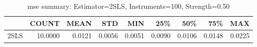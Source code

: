 \begin{table}[ht]
\centering
\caption{mse summary: Estimator=2SLS, Instruments=100, Strength=0.50}
\begin{tabular}{lrrrrrrrr}
\toprule
 & COUNT & MEAN & STD & MIN & 25\% & 50\% & 75\% & MAX \\
\midrule
2SLS & 10.0000 & 0.0121 & 0.0056 & 0.0051 & 0.0090 & 0.0106 & 0.0148 & 0.0225 \\
\bottomrule
\end{tabular}
\end{table}
